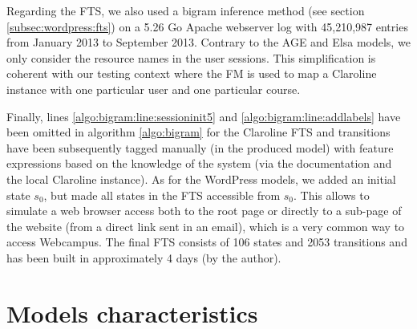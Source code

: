 Regarding the \gls{FTS}, we also used a bigram inference method (see section \ref{subsec:wordpress:fts}) on a 5.26 Go Apache webserver log with 45,210,987 entries from January 2013 to September 2013. Contrary to the AGE and Elsa models, we only consider the resource names in the user sessions. This simplification is coherent with our testing context where the FM is used to map a Claroline instance with one particular user and one particular course.

Finally, lines \ref{algo:bigram:line:sessioninit5} and \ref{algo:bigram:line:addlabels} have been omitted in algorithm \ref{algo:bigram} for the Claroline FTS and transitions have been subsequently tagged manually (in the produced model) with feature expressions based on the knowledge of the system (via the documentation and the local Claroline instance). As for the WordPress models, we added an initial state $s_0$, but made all states in the FTS accessible from $s_0$. This allows to simulate a web browser access both to the root page or directly to a sub-page of the website (\eg from a direct link sent in an email), which is a very common way to access Webcampus. The final FTS consists of 106 states and 2053 transitions and has been built in approximately 4 days (by the author).


\section{Models characteristics}

\label{sec:casestudy:characteristics}


